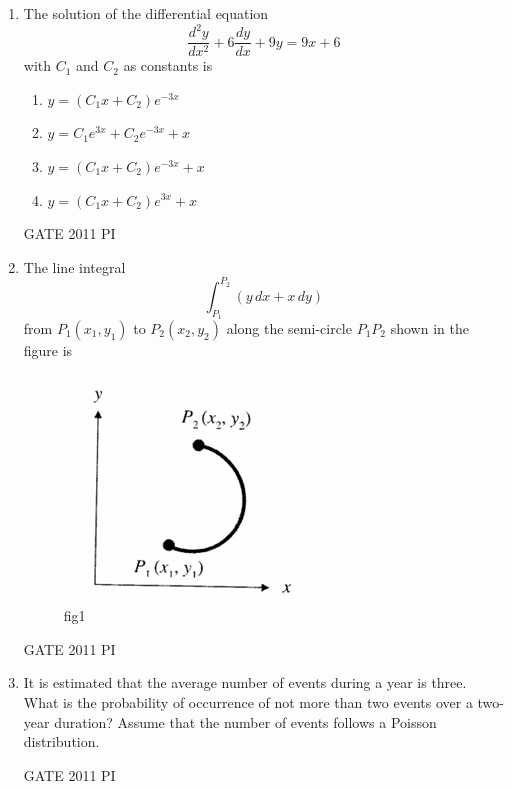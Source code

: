 \documentclass[journal,12pt,onecolumn]{IEEEtran}
\theoremstyle{remark}
\begin{document}
\begin{enumerate}
\item The solution of the differential equation 
\[
\frac{d^2y}{dx^2} + 6 \frac{dy}{dx} + 9y = 9x + 6
\]
with $C_1$ and $C_2$ as constants is

\begin{multicols}{2}
\begin{enumerate}
    \item $y = (C_1 x + C_2)e^{-3x}$
    \item $y = C_1 e^{3x} + C_2 e^{-3x} + x$
    \item $y = (C_1 x + C_2)e^{-3x} + x$
    \item $y = (C_1 x + C_2)e^{3x} + x$
\end{enumerate}
\end{multicols}
\hfill{GATE 2011 PI}
\item The line integral 
\[
\int_{P_1}^{P_2} \left( y \, dx + x \, dy \right)
\]
from $P_1(x_1, y_1)$ to $P_2(x_2, y_2)$ along the semi-circle $P_1 P_2$ shown in the figure is
\begin{figure}[H]
    \centering
    \includegraphics[width=0.25\linewidth]{figs/Q.4.png}
    \caption{fig1}
    \label{fig:figs/Q.4.png}
\end{figure}
\hfill{GATE 2011 PI}
\begin{enumerate}
\end{enumerate}
\item It is estimated that the average number of events during a year is three. What is the probability of occurrence of not more than two events over a two-year duration? Assume that the number of events follows a Poisson distribution.  

\hfill GATE 2011 PI  

\begin{enumerate}
\end{enumerate}


\end{enumerate}
\end{document}
